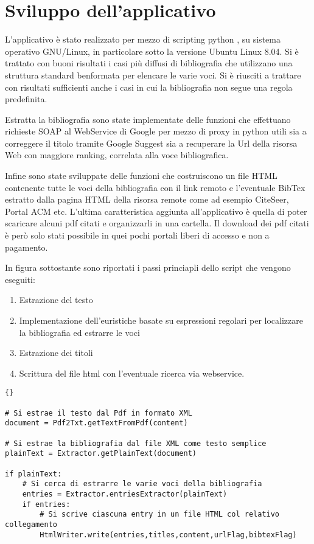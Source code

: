 \section{Sviluppo dell'applicativo} \label{software}

L'applicativo è stato realizzato per mezzo di scripting python \cite{pydoc}, su sistema operativo GNU/Linux, in particolare sotto la versione Ubuntu Linux 8.04. Si è trattato con buoni risultati i casi più diffusi di bibliografia che utilizzano una struttura standard benformata per elencare le varie voci. Si è riusciti a trattare con risultati sufficienti anche i casi in cui la bibliografia non segue una regola predefinita.

Estratta la bibliografia sono state implementate delle funzioni che effettuano richieste SOAP al WebService di Google \cite{GWS} per mezzo di proxy in python \cite{ibm-py-ws} utili sia a correggere il titolo tramite Google Suggest sia a recuperare la Url della risorsa Web con maggiore ranking, correlata alla voce bibliografica. 

Infine sono state sviluppate delle funzioni che costruiscono un file HTML contenente tutte le voci della bibliografia con il link remoto e l'eventuale BibTex estratto dalla pagina HTML della risorsa remote come ad esempio CiteSeer, Portal ACM etc. L'ultima caratteristica aggiunta all'applicativo è quella di poter scaricare alcuni pdf citati e organizzarli in una cartella. Il download dei pdf citati è però solo stati possibile in quei pochi portali liberi di accesso e non a pagamento.

In figura sottostante sono riportati i passi princiapli dello script che vengono eseguiti:
\begin{enumerate}
	\item Estrazione del testo
	\item Implementazione dell'euristiche basate su espressioni regolari per localizzare la bibliografia ed estrarre le voci
	\item Estrazione dei titoli
	\item Scrittura del file html con l'eventuale ricerca via webservice. 
\end{enumerate}


\begin{lstlisting}[frame=r,caption=Il File principale - pdftoref.py ,breaklines=true,basicstyle=\small]{}

# Si estrae il testo dal Pdf in formato XML
document = Pdf2Txt.getTextFromPdf(content)

# Si estrae la bibliografia dal file XML come testo semplice
plainText = Extractor.getPlainText(document)

if plainText:
	# Si cerca di estrarre le varie voci della bibliografia 
	entries = Extractor.entriesExtractor(plainText)
	if entries:
		# Si scrive ciascuna entry in un file HTML col relativo collegamento
		HtmlWriter.write(entries,titles,content,urlFlag,bibtexFlag)

\end{lstlisting}

